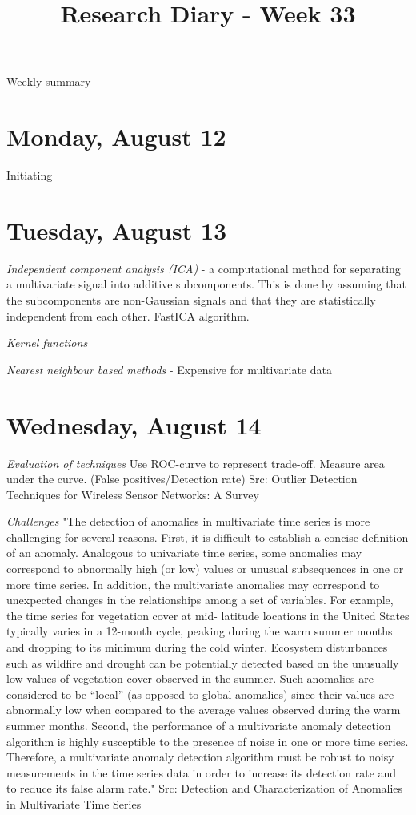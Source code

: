 \documentclass[11pt,letterpaper]{article}
\begin{document}
\univlogo

\title{Research Diary - Week 33}

{\Huge Weekly summary}\\[5mm]

\section*{Monday, August 12}
Initiating

\section*{Tuesday, August 13}
\textit{Independent component analysis (ICA)} -  a computational method for separating a multivariate signal into additive subcomponents. This is done by assuming that the subcomponents are non-Gaussian signals and that they are statistically independent from each other. FastICA algorithm.

\textit{Kernel functions}

\textit{Nearest neighbour based methods} - Expensive for multivariate data

\section*{Wednesday, August 14}
\textit{Evaluation of techniques}
Use ROC-curve to represent trade-off. Measure area under the curve. (False positives/Detection rate)
Src: Outlier Detection Techniques for Wireless Sensor Networks: A Survey

\textit{Challenges}
"The detection of anomalies in multivariate time series
is more challenging for several reasons. First, it is difficult to establish a concise definition of an anomaly. Analogous to univariate time series, some anomalies may correspond to abnormally high (or low) values or unusual subsequences in one or more time series. In addition, the multivariate anomalies may correspond to unexpected changes in the relationships among a set of variables. For example, the time series for vegetation cover at mid- latitude locations in the United States typically varies in a 12-month cycle, peaking during the warm summer months and dropping to its minimum during the cold winter. Ecosystem disturbances such as wildfire and drought can be potentially detected based on the unusually low values of vegetation cover observed in the summer. Such anomalies are considered to be “local” (as opposed to global anomalies) since their values are abnormally low when compared to the average values observed during the warm summer months. Second, the performance of a multivariate anomaly detection algorithm is highly susceptible to the presence of noise in one or more time series. Therefore, a multivariate anomaly detection algorithm must be robust to noisy measurements in the time series data in order to increase its detection rate and to reduce its false alarm rate."
Src: Detection and Characterization of Anomalies in Multivariate Time Series
\end{document}
